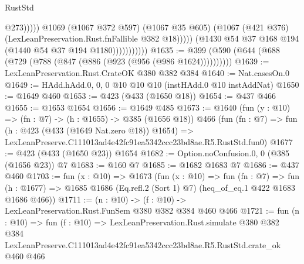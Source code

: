\begin{lexlean}{RustStd}
\begin{coremodule}
                                      @273)))))
                            @1069
                            (@1067 @372 @597)
                            (@1067 @35 @605)
                            (@1067 (@421 @376) (LexLeanPreservation.Rust.fnFallible @382 @18)))))
                      (@1430 @54 @37 @168 @194 (@1440 @54 @37 @194 @1180)))))))))))
@1635 := @399 (@590 (@644 (@688 (@729 (@788 (@847 (@886 (@923 (@956 (@986 @1624))))))))))
@1639 := LexLeanPreservation.Rust.CrateOK @380 @382 @384
@1640 := Nat.casesOn.{0}
@1649 := HAdd.hAdd.{0, 0, 0} @10 @10 @10 (instHAdd.{0} @10 instAddNat)
@1650 := @1649 @460
@1653 := @423 (@433 (@1650 @18))
@1654 := @437 @466
@1655 := @1653 @1654
@1656 := @1649 @485
@1673 := @1640
    (fun (y : @10) => (fn : @7) -> (h : @1655) -> @385 (@1656 @18))
    @466
    (fun (fn : @7) =>
    fun (h : @423 (@433 (@1649 Nat.zero @18)) @1654) =>
    LexLeanPreserve.C111013ad4e42fc91ea5342ccc23bd8ae.R5.RustStd.fun0)
@1677 := @423 (@433 (@1650 @23)) @1654
@1682 := Option.noConfusion.{0, 0} (@385 (@1656 @23)) @7
@1683 := @160 @7
@1685 := @1682 @1683 @7
@1686 := @437 @460
@1703 := fun (x : @10) =>
  @1673
    (fun (x : @10) =>
    fun (fn : @7) =>
    fun (h : @1677) => @1685 @1686 (Eq.refl.{2} (Sort 1) @7) (heq_of_eq.{1} @422 @1683 @1686 @466))
@1711 := (n : @10) -> (f : @10) -> LexLeanPreservation.Rust.FunSem @380 @382 @384 @460 @466
@1721 := fun (n : @10) =>
  fun (f : @10) =>
  LexLeanPreservation.Rust.simulate
    @380
    @382
    @384
    LexLeanPreserve.C111013ad4e42fc91ea5342ccc23bd8ae.R5.RustStd.crate_ok
    @460
    @466
\end{coremodule}
\end{lexlean}
